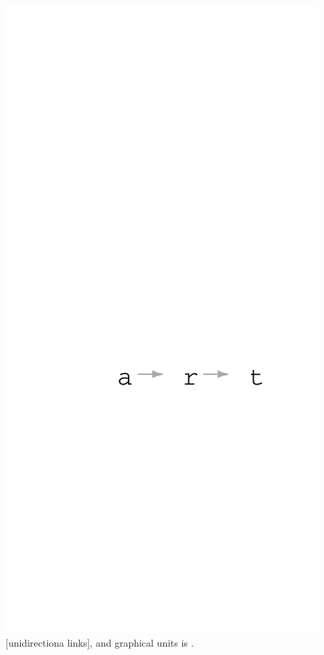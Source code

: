 \documentclass[article]{jss}
\begin{document}
\begin{minipage}{0.8\textwidth}
\centering
\includegraphics{article_rvTH11-art_only}
[unidirectiona links]{,  and  graphical units is .}
\end{minipage}
\end{document}
